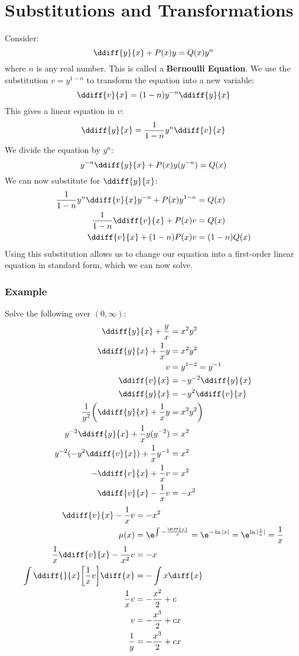 \documentclass{math}
\begin{document}
\section*{Substitutions and Transformations}
Consider:
\[ \ddiff{y}{x}+P(x)y = Q(x)y^n \]
where \( n \) is any real number. This is called a \textbf{Bernoulli Equation}.
We use the substitution \( v = y^{1-n} \) to transform the equation into a new
variable:
\[ \ddiff{v}{x} = (1-n)y^{-n}\ddiff{y}{x} \]
This gives a linear equation in \( v \):
\[ \ddiff{y}{x} = \frac{1}{1-n}y^n\ddiff{v}{x} \]
We divide the equation by \( y^n \):
\[ y^{-n}\ddiff{y}{x}+P(x)y(y^{-n}) = Q(x) \]
We can now substitute for \( \ddiff{y}{x} \):
\begin{align*}
  \frac{1}{1-n}y^n\ddiff{v}{x}y^{-n}+P(x)y^{1-n} &= Q(x) \\
  \frac{1}{1-n}\ddiff{v}{x}+P(x)v &= Q(x) \\
  \ddiff{v}{x}+(1-n)P(x)v &= (1-n)Q(x)
\end{align*}
Using this substitution allows us to change our equation into a first-order
linear equation in standard form, which we can now solve.

\subsubsection*{Example}
Solve the following over \( (0,\infty) \):
\begin{align*}
  \ddiff{y}{x}+\frac{y}{x} &= x^2y^2 \\
  \ddiff{y}{x}+\frac{1}{x}y &= x^2y^2 \\
  v &= y^{1-2} = y^{-1} \\
  \ddiff{v}{x} &= -y^{-2}\ddiff{y}{x} \\
  \ddiff{y}{x} &= -y^2\ddiff{v}{x} \\
  \frac{1}{y^2}\bigg(\ddiff{y}{x}+\frac{1}{x}y &= x^2y^2\bigg) \\
  y^{-2}\ddiff{y}{x}+\frac{1}{x}y(y^{-2}) &= x^2 \\
  y^{-2}(-y^2\ddiff{v}{x})+\frac{1}{x}y^{-1} &= x^2 \\
  -\ddiff{v}{x}+\frac{1}{x}v &= x^2 \\
  \ddiff{v}{x}-\frac{1}{x}v &= -x^2
\end{align*}
\begin{align*}
  \ddiff{v}{x}-\frac{1}{x}v &= -x^2 \\
  \mu(x) &= \e^{\int-\frac{\diff{x}}{x}} = \e^{-\ln|x|} =
    \e^{\ln|\frac{1}{x}|} = \frac{1}{x} \\
  \frac{1}{x}\ddiff{v}{x}-\frac{1}{x^2}v &= -x \\
  \int\ddiff{}{x}\bigg[\frac{1}{x}v\bigg]\diff{x} &= -\int x\diff{x} \\
  \frac{1}{x}v &= -\frac{x^2}{2}+c \\
  v &= -\frac{x^3}{2}+cx \\
  \frac{1}{y} &= -\frac{x^3}{2}+cx
\end{align*}
\end{document}
